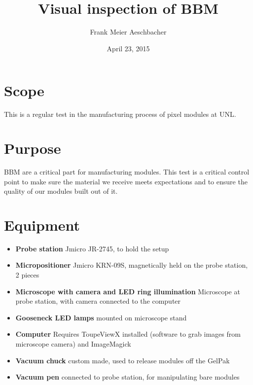 \documentclass[12pt]{unlsilabsop}
\title{Visual inspection of BBM}
\date{April 23, 2015}
\author{Frank Meier Aeschbacher}
\begin{document}
\maketitle

\section{Scope}
This is a regular test in the manufacturing process of pixel modules at UNL.

\section{Purpose}
BBM are a critical part for manufacturing modules. This test is a critical control point to make sure the material we receive meets expectations and to ensure the quality of our modules built out of it.



\section{Equipment}

\begin{itemize}
\item \textbf{Probe station} Jmicro JR-2745, to hold the setup
\item \textbf{Micropositioner} Jmicro KRN-09S, magnetically held on the probe station, 2 pieces
\item \textbf{Microscope with camera and LED ring illumination} Microscope at probe station, with camera connected to the computer
\item \textbf{Gooseneck LED lamps} mounted on microscope stand
\item \textbf{Computer} Requires ToupeViewX installed (software to grab images from microscope camera) and ImageMagick
\item \textbf{Vacuum chuck} custom made, used to release modules off the GelPak
\item \textbf{Vacuum pen} connected to probe station, for manipulating bare modules
\end{itemize}
\end{document}
